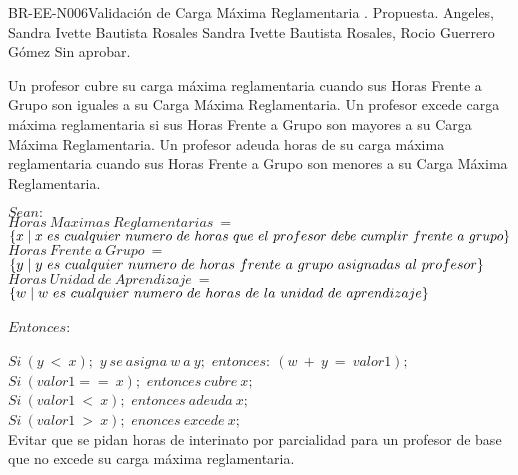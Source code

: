 \begin{BusinessRule}{BR-EE-N006}{Validación de Carga Máxima Reglamentaria}
	{\bcCondition}    %
	{\btEnabler}     %
	{\blControlling}    %
	.
	\BRItem[Estado] Propuesta.
	 Angeles, Sandra Ivette Bautista Rosales
	 Sandra Ivette Bautista Rosales, Rocio Guerrero Gómez
	 Sin aprobar.
	\BRItem[Descripción] \cdtEmpty \\
	\begin{Titemize}
		\Titem Un profesor cubre su carga máxima reglamentaria cuando sus Horas Frente a Grupo son iguales a su Carga Máxima Reglamentaria.
		\Titem Un profesor excede carga máxima reglamentaria si sus Horas Frente a Grupo son mayores a su Carga Máxima Reglamentaria.
		\Titem Un profesor adeuda horas de su carga máxima reglamentaria cuando sus Horas Frente a Grupo son menores a su Carga Máxima Reglamentaria.
	\end{Titemize}
		\BRItem[Sentencia]  $Sean:$ \\
		$Horas\ Maximas\ Reglamentarias\ =$ $\{x \mid x\ es\ cualquier\ numero\ de\ horas\ que\ el\ profesor\ debe\\\ cumplir\ frente\ a\ grupo\}$ \\
		$Horas\ Frente\ a\ Grupo\ =$ $\{y \mid y\ es\ cualquier\ numero\ de\ horas\ frente\ a\ grupo\ asignadas\ al\\\ profesor\}$ \\
		$Horas\ Unidad\ de\ Aprendizaje\ =$ $\{w \mid w\ es\ cualquier\ numero\ de\ horas\ de\ la\ unidad\ de\\\ aprendizaje\}$ \\\\
		$Entonces:$ \\\\
		$Si\ (y\ <\ x);$  $y\ se\ asigna\ w\ a\ y;$  $entonces:\ (w\ +\ y\ =\ valor1);$ \\
		$Si\ (valor1 ==\ x);$  $entonces\ cubre\ x;$ \\
		$Si\ (valor1\ <\ x);$  $entonces\ adeuda\ x;$ \\
		$Si\ (valor1\ >\ x);$  $enonces\ excede\ x;$ \\
	\BRItem[Motivación] Evitar que se pidan horas de interinato por parcialidad para un profesor de base que no excede su carga máxima reglamentaria.

\end{BusinessRule}
